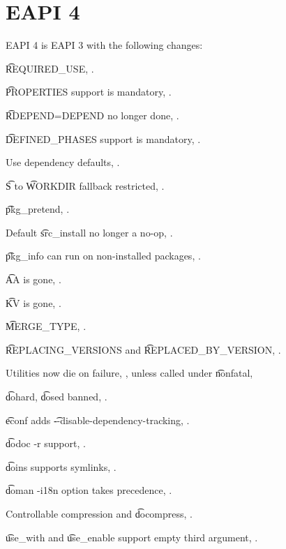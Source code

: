 \section{EAPI 4}

EAPI 4 is EAPI 3 with the following changes:

\begin{compactitem}
\item \t{REQUIRED_USE}, .
\item \t{PROPERTIES} support is mandatory, .
\item \t{RDEPEND=DEPEND} no longer done, .
\item \t{DEFINED_PHASES} support is mandatory, .
\item Use dependency defaults, .
\item \t{S} to \t{WORKDIR} fallback restricted, .
\item \t{pkg_pretend}, .
\item Default \t{src_install} no longer a no-op, .
\item \t{pkg_info} can run on non-installed packages, .
\item \t{AA} is gone, .
\item \t{KV} is gone, .
\item \t{MERGE_TYPE}, .
\item \t{REPLACING_VERSIONS} and \t{REPLACED_BY_VERSION}, .
\item Utilities now die on failure, , unless called under \t{nonfatal},
\item \t{dohard}, \t{dosed} banned, .
\item \t{econf} adds \t{-{}-disable-dependency-tracking}, .
\item \t{dodoc -r} support, .
\item \t{doins} supports symlinks, .
\item \t{doman -i18n} option takes precedence, .
\item Controllable compression and \t{docompress}, .
\item \t{use_with} and \t{use_enable} support empty third argument, .
\end{compactitem}

